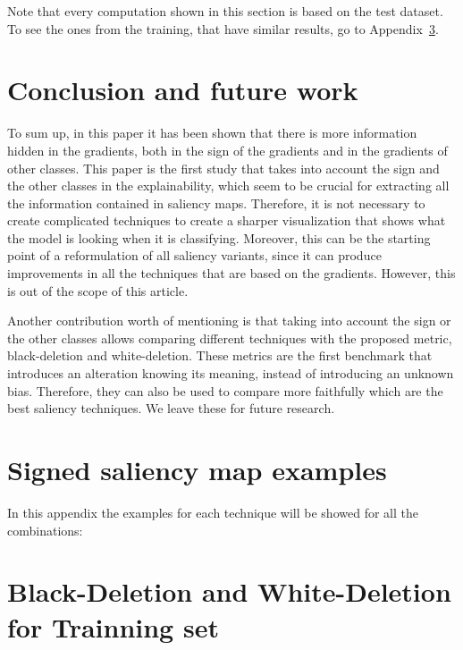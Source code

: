 \documentclass[preprint,12pt]{elsarticle}
\begin{document}
Note that every computation shown in this section is based on the test dataset. To see the ones from the training, that have similar results, go to Appendix~\ref{sec:black-deletion and white-deletion for training set}.


\section{Conclusion and future work}
\label{sec:conclusions and future research}
To sum up, in this paper it has been shown that there is more information hidden in the gradients, both in the sign of the gradients and in the gradients of other classes. This paper is the first study that takes into account the sign and the other classes in the explainability, which seem to be crucial for extracting all the information contained in saliency maps. Therefore, it is not necessary to create complicated techniques to create a sharper visualization that shows what the model is looking when it is classifying. Moreover, this can be the starting point of a reformulation of all saliency variants, since it can produce improvements in all the techniques that are based on the gradients. However, this is out of the scope of this article.

Another contribution worth of mentioning is that taking into account the sign or the other classes allows comparing different techniques with the proposed metric, black-deletion and white-deletion. These metrics are the first benchmark that introduces an alteration knowing its meaning, instead of introducing an unknown bias. Therefore, they can also be used to compare more faithfully which are the best saliency techniques. We leave these for future research.


 
{\small}

\appendix

\section{Signed saliency map examples}
\label{sec:signed saliency map examples}
In this appendix the examples for each technique will be showed for all the combinations:

\section{Black-Deletion and White-Deletion for Trainning set}
\label{sec:black-deletion and white-deletion for training set}
\end{document}
